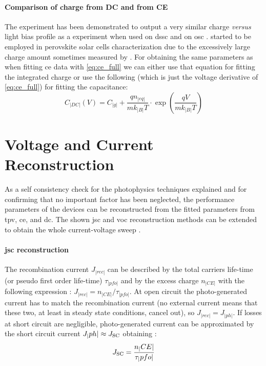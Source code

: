 	\paragraph{Comparison of charge from DC and from CE}
	The  experiment has been demonstrated to output a very similar charge \textsl{versus} light bias profile as a  experiment when used on \gls{dssc} \cite{ORegan2005,Barnes2013} and on \gls{osc} \cite{Shuttle2008a}.
	 started to be employed in perovskite solar cells characterization due to the excessively large charge amount sometimes measured by  \cite{Wheeler2017,ORegan2015b}.
	For obtaining the same parameters as when fitting \gls{ce} data with \cref{eq:ce_full} we can either use that equation for fitting the integrated charge or use the following (which is just the voltage derivative of \cref{eq:ce_full}) for fitting the capacitance:
	\begin{equation}\label{eq:dc_full}
		C_|DC|(V) = C_|g| + \frac{qn_|eq|}{mk_|B|T} \cdot \exp(\frac{qV}{mk_|B|T})
	\end{equation}

	\FloatBarrier
	\newpage
\section{Voltage and Current Reconstruction}
	As a self consistency check for the photophysics techniques explained and for confirming that no important factor has been neglected, the performance parameters of the devices can be reconstructed from the fitted parameters from \gls{tpv}, \gls{ce}, and \gls{dc}.
	The shown \gls{jsc} and \gls{voc} reconstruction methods can be extended to obtain the whole current-voltage sweep \cite{Maurano2011}.

	\paragraph{\Gls{jsc} reconstruction}\label{jsc_reconstruction}
	The recombination current $J_|rec|$ can be described by the total carriers life\hyp{}time (or pseudo first order life\hyp{}time) $\tau_|pfo|$ and by the excess charge $n_|CE|$ with the following expression \cite{Wheeler2017,Du2018}: $J_|rec| = n_|CE| / \tau_|pfo|$.
	At open circuit the photo\hyp{}generated current has to match the recombination current (no external current means that these two, at least in steady state conditions, cancel out), so $J_|rec| = J_|ph|$.
	If losses at short circuit are negligible, photo\hyp{}generated current can be approximated by the short circuit current $J_|ph| \approx J_\mathrm{SC}$ obtaining \cite{ORegan2015b}:
	\begin{equation}\label{eq:reconstruction_jsc}
		J_\mathrm{SC} = \frac{n_|CE|}{\tau_|pfo|}
	\end{equation}

